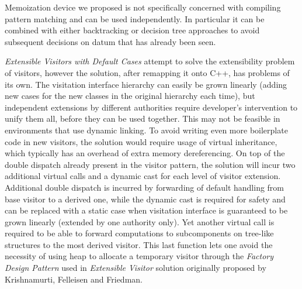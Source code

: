 \documentclass[preprint]{sigplanconf}
\begin{document}
Memoization device we proposed is not specifically concerned with compiling 
pattern matching and can be used independently. In particular it can be combined 
with either backtracking or decision tree approaches to avoid subsequent 
decisions on datum that has already been seen.


\emph{Extensible Visitors with Default Cases}\cite[]{Zenger:2001} attempt to solve the extensibility problem of visitors, 
however the solution, after 
remapping it onto C++, has problems of its own. The visitation interface 
hierarchy can easily be grown linearly (adding new cases for the new classes in 
the original hierarchy each time), but independent extensions by different  
authorities require developer's intervention to unify them all, before they can 
be used together. This may not be feasible in environments that use dynamic 
linking. To avoid writing even more boilerplate code in new visitors, the 
solution would require usage of virtual inheritance, which typically has 
an overhead of extra memory dereferencing. On top of the double dispatch already 
present in the visitor pattern, the solution will incur two additional virtual 
calls and a dynamic cast for each level of visitor extension. Additional double 
dispatch is incurred by forwarding of default handling from base visitor to a 
derived one, while the dynamic cast is required for safety and can be replaced 
with a static case when visitation interface is guaranteed to be grown linearly 
(extended by one authority only). Yet another virtual call is required to be 
able to forward computations to subcomponents on tree-like structures to the 
most derived visitor. This last function lets one avoid the necessity of using 
heap to allocate a temporary visitor through the \emph{Factory Design 
Pattern}\cite{DesignPatterns1993} used in \emph{Extensible Visitor} solution 
originally proposed by Krishnamurti, Felleisen and Friedman\cite{Krishnamurthi98}.
\end{document}
